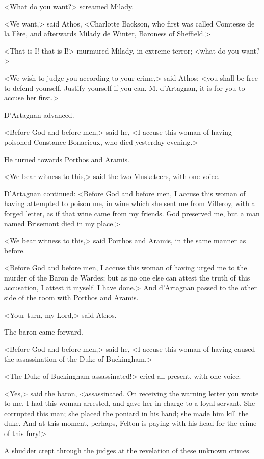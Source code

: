 <What do you want?> screamed Milady. 

<We want,> said Athos, <Charlotte Backson, who first was called Comtesse de la Fère, and afterwards Milady de Winter, Baroness of Sheffield.> 

<That is I! that is I!> murmured Milady, in extreme terror; <what do you want?> 

<We wish to judge you according to your crime,> said Athos; <you shall be free to defend yourself. Justify yourself if you can. M. d'Artagnan, it is for you to accuse her first.> 

D'Artagnan advanced. 

<Before God and before men,> said he, <I accuse this woman of having poisoned Constance Bonacieux, who died yesterday evening.> 

He turned towards Porthos and Aramis. 

<We bear witness to this,> said the two Musketeers, with one voice. 

D'Artagnan continued: <Before God and before men, I accuse this woman of having attempted to poison me, in wine which she sent me from Villeroy, with a forged letter, as if that wine came from my friends. God preserved me, but a man named Brisemont died in my place.> 

<We bear witness to this,> said Porthos and Aramis, in the same manner as before. 

<Before God and before men, I accuse this woman of having urged me to the murder of the Baron de Wardes; but as no one else can attest the truth of this accusation, I attest it myself. I have done.> And d'Artagnan passed to the other side of the room with Porthos and Aramis. 

<Your turn, my Lord,> said Athos. 

The baron came forward. 

<Before God and before men,> said he, <I accuse this woman of having caused the assassination of the Duke of Buckingham.> 

<The Duke of Buckingham assassinated!> cried all present, with one voice. 

<Yes,> said the baron, <assassinated. On receiving the warning letter you wrote to me, I had this woman arrested, and gave her in charge to a loyal servant. She corrupted this man; she placed the poniard in his hand; she made him kill the duke. And at this moment, perhaps, Felton is paying with his head for the crime of this fury!> 

A shudder crept through the judges at the revelation of these unknown crimes. 

